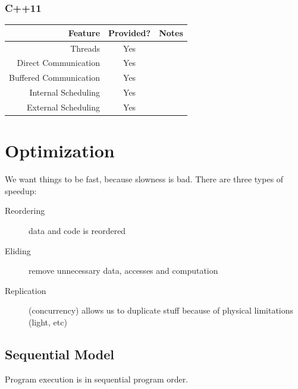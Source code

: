             \subsection{C++11} %
            \label{sub:c_11}
                \begin{table}[h]
                    \label{tbl:cpp_11}
                    \centering
                    \begin{tabular}{| r || c | c |}
                        \hline
                        Feature                 & Provided? & Notes \\ \hline \hline
                        Threads                 & Yes & \\ \hline
                        Direct Communication    & Yes & \\ \hline
                        Buffered Communication  & Yes & \\ \hline
                        Internal Scheduling     & Yes & \\ \hline
                        External Scheduling     & Yes & \\ \hline
                    \end{tabular}
                \end{table}
    \chapter{Optimization} %
    \label{cha:optimization}
        We want things to be fast, because slowness is bad.
        There are three types of speedup:
        \begin{description}
            \item[Reordering] data and code is reordered
            \item[Eliding] remove unnecessary data, accesses and computation
            \item[Replication] (concurrency) allows us to duplicate stuff because of physical limitations (light, etc)
        \end{description}
        \section{Sequential Model} %
        \label{sec:sequential_model}
            Program execution is in sequential program order.

